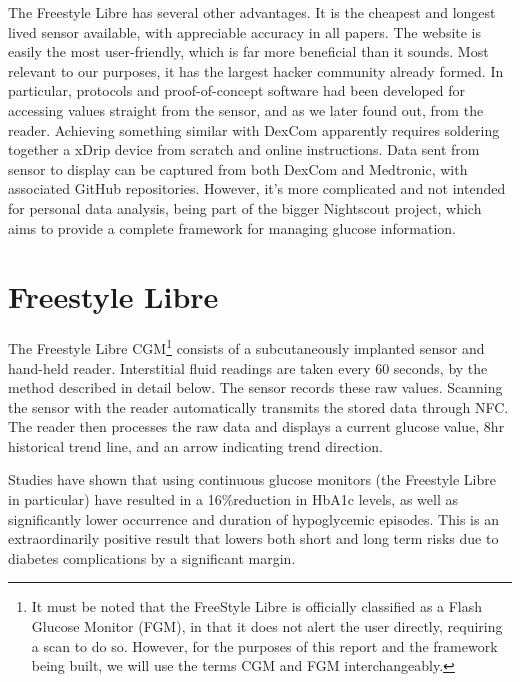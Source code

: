 The Freestyle Libre has several other advantages. It is the cheapest and longest lived sensor available, with appreciable accuracy in all papers. The website is easily the most user-friendly, which is far more beneficial than it sounds. Most relevant to our purposes, it has the largest hacker community already formed. In particular, protocols and proof-of-concept software had been developed for accessing values straight from the sensor, and as we later found out, from the reader. Achieving something similar with DexCom apparently requires soldering together a xDrip device from scratch and online instructions. Data sent from sensor to display can be captured from both DexCom and Medtronic, with associated GitHub repositories. However, it’s more complicated and not intended for personal data analysis, being part of the bigger Nightscout\cite{noauthor_nightscout_nodate} project, which aims to provide a complete framework for managing glucose information.

\section{Freestyle Libre}
The Freestyle Libre CGM\footnote{It must be noted that the FreeStyle Libre is officially classified as a Flash Glucose Monitor (FGM), in that it does not alert the user directly, requiring a scan to do so. However, for the purposes of this report and the framework being built, we will use the terms CGM and FGM interchangeably.} consists of a subcutaneously implanted sensor and hand-held reader. Interstitial fluid readings are taken every 60 seconds, by the method described in detail below. The sensor records these raw values. Scanning the sensor with the reader automatically transmits the stored data through NFC. The reader then processes the raw data and displays a current glucose value, 8hr historical trend line, and an arrow indicating trend direction.

Studies have shown \cite{abbott_real-world_nodate} that using continuous glucose monitors (the Freestyle Libre in particular) have resulted in a 16\%reduction in HbA1c levels, as well as significantly lower occurrence and duration of hypoglycemic episodes. This is an extraordinarily positive result that lowers both short and long term risks due to diabetes complications by a significant margin.